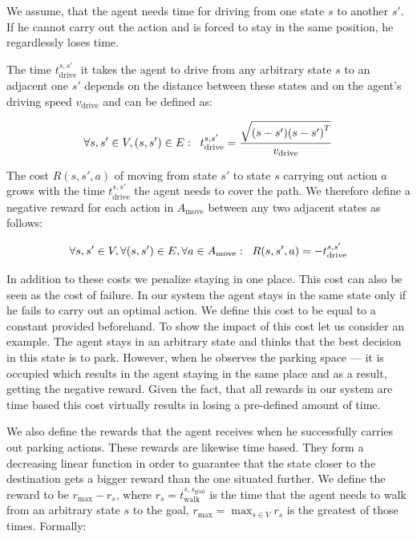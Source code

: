 We assume, that the agent needs time for driving from one state $s$ to another
$s'$. If he cannot carry out the action and is forced to stay in the same
position, he regardlessly loses time.

The time $t^{s, s'}_\mathrm{drive}$ it takes the agent to drive from any arbitrary state $s$ to an
adjacent one $s'$ depends on the distance between these states and on the
agent's driving speed $v_{\mathrm{drive}}$ and can be defined as:

\begin{equation}
\label{eq:time_to_drive}
\forall s,s' \in V, (s, s') \in E: \hspace{2mm} t_{\mathrm{drive}}^{s,s'}
= \frac{\sqrt{(s - s') {(s - s')}^T}}{v_{\mathrm{drive}}}
\end{equation}

The cost $R(s, s', a)$ of moving from state $s'$ to state $s$ carrying out
action $a$ grows with the time $t_{\mathrm{drive}}^{s,s'}$ the agent needs to
cover the path. We therefore define a negative reward for each action in
$A_{\mathrm{move}}$ between any two adjacent states as follows:

\begin{equation}
\label{eq:drive_reward}
\forall s,s' \in V, \forall (s, s') \in E, \forall a \in A_{\mathrm{move}}: \hspace{2mm} R(s, s', a) = -t_{\mathrm{drive}}^{s,s'}
\end{equation}

In addition to these costs we penalize staying in one place. This cost can
also be seen as the cost of failure. In our system the agent stays in the same
state only if he fails to carry out an optimal action. We define this cost to
be equal to a constant provided beforehand. To show the impact of this cost
let us consider an example. The agent stays in an arbitrary state and thinks
that the best decision in this state is to park. However, when he observes the
parking space --- it is occupied which results in the agent staying in the
same place and as a result, getting the negative reward. Given the fact, that
all rewards in our system are time based this cost virtually results in losing
a pre-defined amount of time.

We also define the rewards that the agent receives when he successfully
carries out parking actions. These rewards are likewise time based. They form
a decreasing linear function in order to guarantee that the state closer to
the destination gets a bigger reward than the one situated further. We define
the reward to be $r_{\max} - r_s$, where $r_s =
t_{\mathrm{walk}}^{s,s_{\mathrm{goal}}}$ is the time that the agent needs to
walk from an arbitrary state $s$ to the goal, $r_{\max} = \max_{s \in V}r_s$
is the greatest of those times. Formally:

